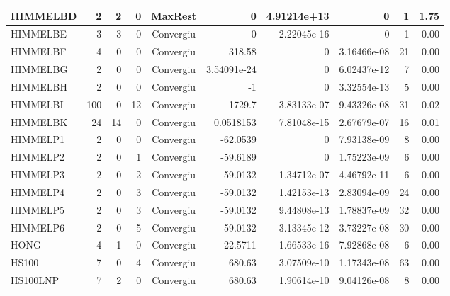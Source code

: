 \begin{center}
\begin{longtable}{|l|r|r|r|c|r|r|r|r|r|}
HIMMELBD &      2 &      2 &      0 & MaxRest    &           0 &    4.91214e+13 &           0 &      1 &    1.75 \\ \hline
HIMMELBE &      3 &      3 &      0 & Convergiu  &           0 &    2.22045e-16 &           0 &      1 &    0.00 \\ \hline
HIMMELBF &      4 &      0 &      0 & Convergiu  &      318.58 &              0 & 3.16466e-08 &     21 &    0.00 \\ \hline
HIMMELBG &      2 &      0 &      0 & Convergiu  & 3.54091e-24 &              0 & 6.02437e-12 &      7 &    0.00 \\ \hline
HIMMELBH &      2 &      0 &      0 & Convergiu  &          -1 &              0 & 3.32554e-13 &      5 &    0.00 \\ \hline
HIMMELBI &    100 &      0 &     12 & Convergiu  &     -1729.7 &    3.83133e-07 & 9.43326e-08 &     31 &    0.02 \\ \hline
HIMMELBK &     24 &     14 &      0 & Convergiu  &   0.0518153 &    7.81048e-15 & 2.67679e-07 &     16 &    0.01 \\ \hline
HIMMELP1 &      2 &      0 &      0 & Convergiu  &    -62.0539 &              0 & 7.93138e-09 &      8 &    0.00 \\ \hline
HIMMELP2 &      2 &      0 &      1 & Convergiu  &    -59.6189 &              0 & 1.75223e-09 &      6 &    0.00 \\ \hline
HIMMELP3 &      2 &      0 &      2 & Convergiu  &    -59.0132 &    1.34712e-07 & 4.46792e-11 &      6 &    0.00 \\ \hline
HIMMELP4 &      2 &      0 &      3 & Convergiu  &    -59.0132 &    1.42153e-13 & 2.83094e-09 &     24 &    0.00 \\ \hline
HIMMELP5 &      2 &      0 &      3 & Convergiu  &    -59.0132 &    9.44808e-13 & 1.78837e-09 &     32 &    0.00 \\ \hline
HIMMELP6 &      2 &      0 &      5 & Convergiu  &    -59.0132 &    3.13345e-12 & 3.73227e-08 &     30 &    0.00 \\ \hline
    HONG &      4 &      1 &      0 & Convergiu  &     22.5711 &    1.66533e-16 & 7.92868e-08 &      6 &    0.00 \\ \hline
   HS100 &      7 &      0 &      4 & Convergiu  &      680.63 &    3.07509e-10 & 1.17343e-08 &     63 &    0.00 \\ \hline
HS100LNP &      7 &      2 &      0 & Convergiu  &      680.63 &    1.90614e-10 & 9.04126e-08 &      8 &    0.00 \\ \hline

\end{longtable}
\end{center}
